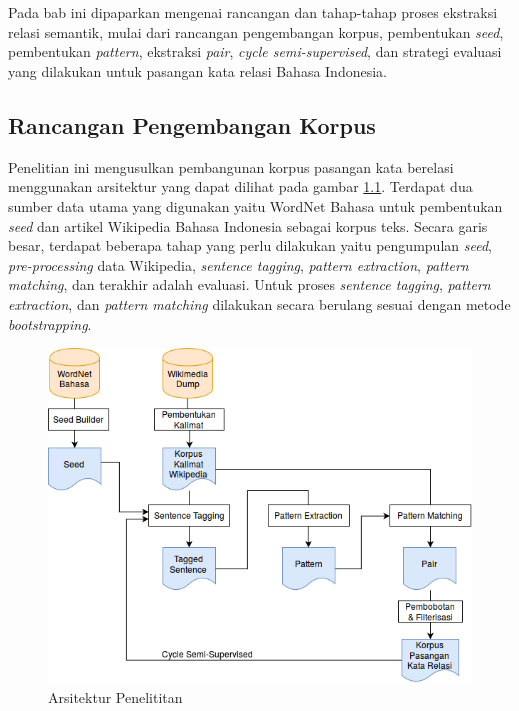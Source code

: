 \chapter{\babTiga}
Pada bab ini dipaparkan mengenai rancangan dan tahap-tahap proses ekstraksi relasi semantik, mulai dari rancangan pengembangan korpus, pembentukan \textit{seed}, pembentukan \textit{pattern}, ekstraksi \textit{pair}, \textit{cycle semi-supervised}, dan strategi evaluasi yang dilakukan untuk pasangan kata relasi Bahasa Indonesia. 


\section{Rancangan Pengembangan Korpus}
Penelitian ini mengusulkan pembangunan korpus pasangan kata berelasi menggunakan arsitektur yang dapat dilihat pada gambar \ref{fig:arsitektur-penelitian}. Terdapat dua sumber data utama yang digunakan yaitu WordNet Bahasa untuk pembentukan \textit{seed} dan artikel Wikipedia Bahasa Indonesia sebagai korpus teks. Secara garis besar, terdapat beberapa tahap yang perlu dilakukan yaitu pengumpulan \textit{seed}, \textit{pre-processing} data Wikipedia, \textit{sentence tagging}, \textit{pattern extraction}, \textit{pattern matching}, dan terakhir adalah evaluasi. Untuk proses \textit{sentence tagging}, \textit{pattern extraction}, dan \textit{pattern matching} dilakukan secara berulang sesuai dengan metode \textit{bootstrapping}. 

\begin{figure}
    \centering
    \includegraphics[scale=0.55]{pics/Pic01-SemiSupervisedCycle}
    \caption{Arsitektur Penelititan}
    \label{fig:arsitektur-penelitian}
\end{figure}

